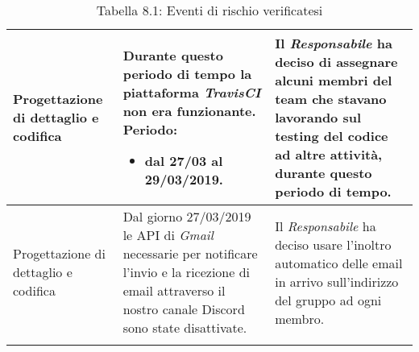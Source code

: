 \begin{longtable}{| m{7em} | m{15em} | m{16em} |}
Progettazione di dettaglio e codifica & Durante questo periodo di tempo la piattaforma \emph{TravisCI} non era funzionante. Periodo:\begin{itemize}
	\item dal 27/03 al 29/03/2019.
\end{itemize} & Il \emph{Responsabile} ha deciso di assegnare alcuni membri del team che stavano lavorando sul testing del codice ad altre attività, durante questo periodo di tempo. \\
\hline

Progettazione di dettaglio e codifica & Dal giorno 27/03/2019 le API di \emph{Gmail} necessarie per notificare l'invio e la ricezione di email attraverso il nostro canale Discord sono state disattivate. & Il \emph{Responsabile} ha deciso usare l'inoltro automatico delle email in arrivo sull'indirizzo del gruppo ad ogni membro. \\
\hline
\caption{Tabella 8.1: Eventi di rischio verificatesi\label{}}
\end{longtable}
\renewcommand{\arraystretch}{1}
\newpage
